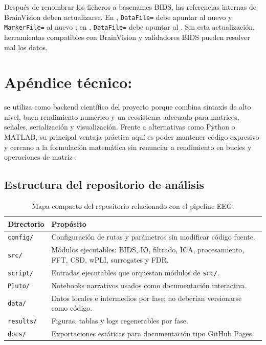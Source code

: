 Después de renombrar los ficheros a basenames BIDS, las referencias internas de BrainVision deben actualizarse. En , \texttt{DataFile=} debe apuntar al nuevo  y \texttt{MarkerFile=} al nuevo ; en , \texttt{DataFile=} debe apuntar al . Sin esta actualización, herramientas compatibles con BrainVision y validadores BIDS pueden resolver mal los datos.

\section{Apéndice técnico: \Julia{}}

\Julia{} se utiliza como backend científico del proyecto porque combina sintaxis de alto nivel, buen rendimiento numérico y un ecosistema adecuado para matrices, señales, serialización y visualización. Frente a alternativas como Python o MATLAB, su principal ventaja práctica aquí es poder mantener código expresivo y cercano a la formulación matemática sin renunciar a rendimiento en bucles y operaciones de matriz \citep{bezanson2017julia}.

\subsection{Estructura del repositorio de análisis}

\begin{fullwidth}
\begin{table}[H]
\centering
\small
\caption{Mapa compacto del repositorio \Julia{} relacionado con el pipeline EEG.}
\label{tab:julia-repo-map}
\begin{tabular}{@{}p{0.18\fulltextwidth}p{0.72\fulltextwidth}@{}}
\toprule
\textbf{Directorio} & \textbf{Propósito} \\
\midrule
\texttt{config/} & Configuración de rutas y parámetros sin modificar código fuente. \\
\texttt{src/} & Módulos ejecutables: BIDS, IO, filtrado, ICA, procesamiento, FFT, CSD, wPLI, surrogates y FDR. \\
\texttt{script/} & Entradas ejecutables que orquestan módulos de \texttt{src/}. \\
\texttt{Pluto/} & Notebooks narrativos usados como documentación interactiva. \\
\texttt{data/} & Datos locales e intermedios por fase; no deberían versionarse como código. \\
\texttt{results/} & Figuras, tablas y logs regenerables por fase. \\
\texttt{docs/} & Exportaciones estáticas para documentación tipo GitHub Pages. \\
\bottomrule
\end{tabular}
\end{table}
\end{fullwidth}

